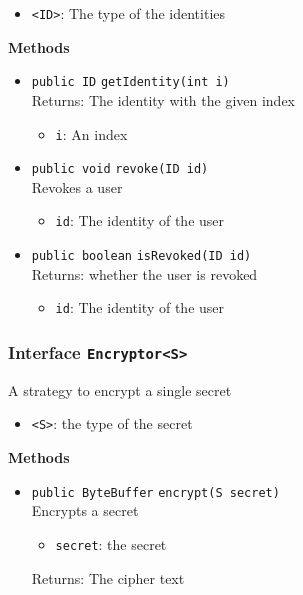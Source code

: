 \begin{itemize}
\item \lstinline|<ID>|: The type of the identities
\end{itemize}



\textbf{Methods}
\begin{itemize}
\item \lstinline|public ID| \lstinline|getIdentity|\lstinline|(int i)|\\
Returns: The identity with the given index
\begin{itemize}
\item \lstinline|i|: An index
\end{itemize}



\item \lstinline|public void| \lstinline|revoke|\lstinline|(ID id)|\\
Revokes a user
\begin{itemize}
\item \lstinline|id|: The identity of the user
\end{itemize}



\item \lstinline|public boolean| \lstinline|isRevoked|\lstinline|(ID id)|\\
Returns: whether the user is revoked
\begin{itemize}
\item \lstinline|id|: The identity of the user
\end{itemize}



\end{itemize}

\subsubsection{Interface \lstinline|Encryptor<S>|}
A strategy to encrypt a single secret \\


\begin{itemize}
\item \lstinline|<S>|: the type of the secret
\end{itemize}



\textbf{Methods}
\begin{itemize}
\item \lstinline|public ByteBuffer| \lstinline|encrypt|\lstinline|(S secret)|\\
Encrypts a secret
\begin{itemize}
\item \lstinline|secret|: the secret
\end{itemize}

Returns: The cipher text

\end{itemize}

